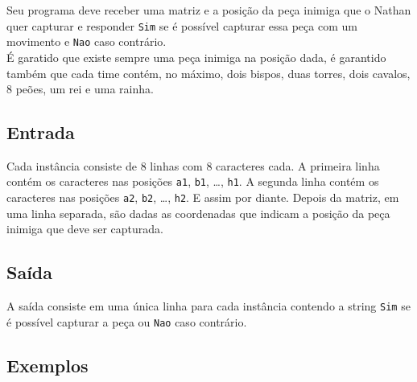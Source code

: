 Seu programa deve receber uma matriz e a posição da peça inimiga que o Nathan quer capturar e responder \texttt{Sim} se é possível capturar essa peça com um movimento e \texttt{Nao} caso contrário. \\
É garatido que existe sempre uma peça inimiga na posição dada, é garantido também que cada time contém, no máximo, dois bispos, duas torres, dois cavalos, 8 peões, um rei e uma rainha. \\


\subsection*{Entrada}

Cada instância consiste de 8 linhas com 8 caracteres cada. A primeira linha contém os caracteres nas posições \texttt{a1}, \texttt{b1}, \dots, \texttt{h1}. A segunda linha contém os caracteres nas posições \texttt{a2}, \texttt{b2}, \dots, \texttt{h2}. E assim por diante. Depois da matriz, em uma linha separada, são dadas as coordenadas que indicam a posição da peça inimiga que deve ser capturada. \\


\subsection*{Saída}

A saída consiste em uma única linha para cada instância contendo a string \texttt{Sim} se é possível capturar a peça ou \texttt{Nao} caso contrário.


\subsection*{Exemplos}

\begin{center}
\end{center}

